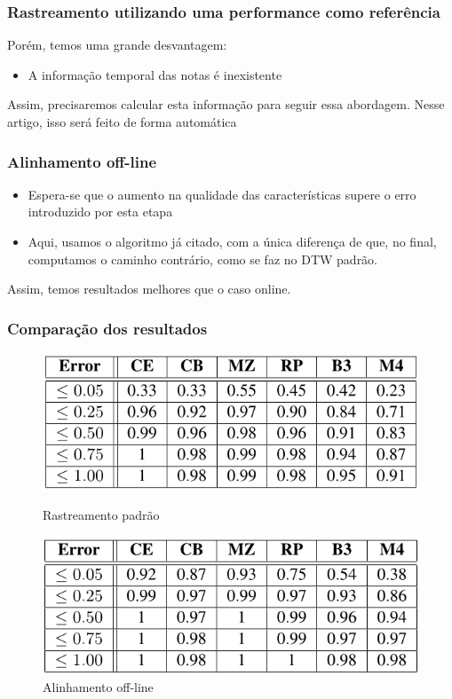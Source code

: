 \begin{frame}
  \frametitle{Rastreamento utilizando uma performance como referência}
  Porém, temos uma grande desvantagem:\pause
  \begin{itemize}
    \item A informação temporal das notas é inexistente\pause
  \end{itemize}
  Assim, precisaremos calcular esta informação para seguir essa abordagem. \pause Nesse artigo, isso será feito de forma automática
\end{frame}


\begin{frame}
  \frametitle{Alinhamento off-line}
  \begin{itemize}
    \item Espera-se que o aumento na qualidade das características supere o erro introduzido por esta etapa\pause
    \item Aqui, usamos o algoritmo já citado, com a única diferença de que, no final, computamos o caminho contrário, como se faz no DTW padrão.
  \end{itemize}
  Assim, temos resultados melhores que o caso online.
\end{frame}

\begin{frame}
  \frametitle{Comparação dos resultados}

  \begin{figure}[!tbp]
    \centering
    \begin{minipage}[b]{0.45\textwidth}
      \includegraphics[width=\textwidth]{src/img/1-Table2-1.png}
      \caption*{Rastreamento padrão}
    \end{minipage}
    \hfill
    \begin{minipage}[b]{0.45\textwidth}
      \includegraphics[width=\textwidth]{src/img/1-Table3-1.png}
      \caption*{Alinhamento off-line}
    \end{minipage}
  \end{figure}
\end{frame}

